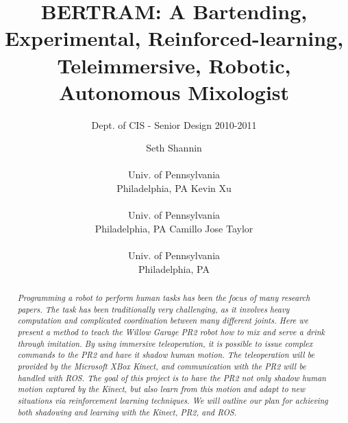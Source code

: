 \documentclass{sig-alternate}
\begin{document}
 

\title{BERTRAM: A Bartending, Experimental, Reinforced-learning, Teleimmersive, Robotic, Autonomous Mixologist}

\subtitle{Dept. of CIS - Senior Design 2010-2011}
\author{
\alignauthor Seth Shannin \\  \\ Univ. of Pennsylvania \\ Philadelphia, PA
\alignauthor Kevin Xu \\  \\ Univ. of Pennsylvania \\ Philadelphia, PA
\alignauthor Camillo Jose Taylor \\  \\ Univ. of Pennsylvania \\ Philadelphia, PA}
\date{}
\maketitle

\begin{abstract}
\textit{Programming a robot to perform human tasks has been the focus of many research papers. The task has been traditionally very challenging, as it involves heavy computation and complicated coordination between many different joints. Here we present a method to teach the Willow Garage PR2 robot how to mix and serve a drink through imitation. By using immersive teleoperation, it is possible to issue complex commands to the PR2 and have it shadow human motion. The teleoperation will be provided by the Microsoft XBox Kinect, and communication with the PR2 will be handled with ROS. The goal of this project is to have the PR2 not only shadow human motion captured by the Kinect, but also learn from this motion and adapt to new situations via reinforcement learning techniques. We will outline our plan for achieving both shadowing and learning with the Kinect, PR2, and ROS.}
\end{abstract}

\end{document}
